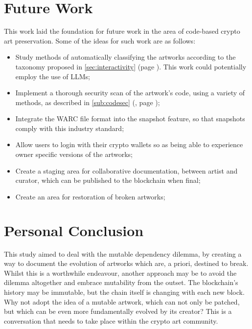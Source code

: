 \section{Future Work}

This work laid the foundation for future work in the area of code-based crypto art preservation. Some of the ideas for such work are as follows:

\begin{itemize}
	\item Study methods of automatically classifying the artworks according to the taxonomy proposed in \autoref{sec:interactivity} (page \pageref{sec:interactivity}). This work could potentially employ the use of LLMs;
	\item Implement a thorough security scan of the artwork's code, using a variety of methods, as described in \autoref{sub:codesec} (, page \pageref{sub:codesec});
	\item Integrate the WARC file format into the snapshot feature, so that snapshots comply with this industry standard;
	\item Allow users to login with their crypto wallets so as being able to experience owner specific versions of the artworks;
	\item Create a staging area for collaborative documentation, between artist and curator, which can be published to the blockchain when final;
	\item Create an area for restoration of broken artworks;
\end{itemize}


\section{Personal Conclusion}

This study aimed to deal with the mutable dependency dilemma, by creating a way to document the evolution of artworks which are, a priori, destined to break. Whilst this is a worthwhile endeavour, another approach may be to avoid the dilemma altogether and embrace mutability from the outset. The blockchain's history may be immutable, but the chain itself is changing with each new block. Why not adopt the idea of a mutable artwork, which can not only be patched, but which can be even more fundamentally evolved by its creator? This is a conversation that needs to take place within the crypto art community.


